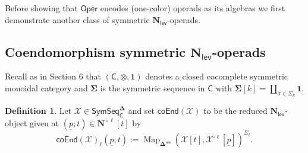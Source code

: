 \documentclass[11pt]{amsart}
\theoremstyle{definition}
\newtheorem{definition}[subsection]{Definition}
\theoremstyle{remark}
\newcommand{\SymSeq}{\mathsf{SymSeq}}
\newcommand{\Oper}{\mathsf{Oper}}
\newcommand{\Map}{\operatorname{Map}}
\newcommand{\Cal}[1]{\mathcal{#1}}
\newcommand{\Ncirc}[1]{\mathbf{N}^{\hat{\circ}#1}}
\newcommand{\boxcirc}{\mathring{\square}}
\newcommand{\Nl}{\mathbf{N}_{\mathsf{lev}}}
\newcommand{\bdel}{\mathbf{\Delta}}
\newcommand{\Dres}{\bdel^{\mathsf{res}}}
\begin{document}
Before showing that $\Oper$ encodes (one-color) operads as its algebras we first demonstrate another class of symmetric $\Nl$-operads. 

\subsection{Coendomorphism symmetric $\Nl$-operads}
Recall as in Section 6 that $(\mathsf{C}, \otimes, \mathbf{1})$ denotes a closed cocomplete symmetric monoidal category and $\mathbf{\Sigma}$ is the symmetric sequence in $\mathsf{C}$ with $\mathbf{\Sigma}[k]=\coprod_{\sigma\in \Sigma_k} \mathbf{1}.$
\begin{definition} \label{def:coend}
    Let $\Cal{X}\in \SymSeq_{\mathsf{C}}^{\bdel}$ and set $\mathsf{coEnd}(\Cal{X})$ to be the reduced  $\Nl$-object given at $(\underline{p};t)\in \Ncirc{\ell}[t]$ by \[ \mathsf{coEnd}(\Cal{X})_{\ell}(\underline{p};t):= \Map_{\Dres} \left( \Cal{X}[t] , \Cal{X}^{\boxcirc \ell} [\underline{p}] \right)^{\Sigma_t}.\]
\end{definition}
\end{document}
